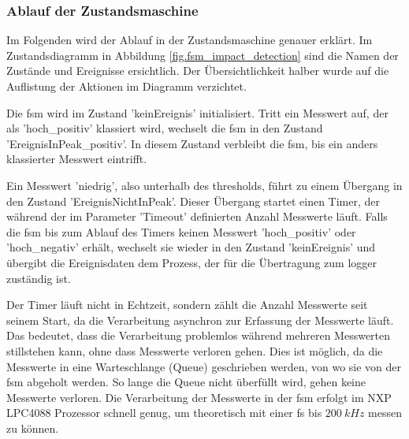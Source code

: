 \subsubsection{Ablauf der Zustandsmaschine}
Im Folgenden wird der Ablauf in der Zustandsmaschine genauer erklärt. Im Zustandsdiagramm in Abbildung \ref{fig.fsm_impact_detection} sind die Namen der Zustände und Ereignisse ersichtlich. Der Übersichtlichkeit halber wurde auf die Auflistung der Aktionen im Diagramm verzichtet.

Die \gls{fsm} wird im Zustand 'keinEreignis' initialisiert. Tritt ein Messwert auf, der als 'hoch\_positiv' klassiert wird, wechselt die \gls{fsm} in den Zustand 'EreignisInPeak\_positiv'. In diesem Zustand verbleibt die \gls{fsm}, bis ein anders klassierter Messwert eintrifft. 

Ein Messwert 'niedrig', also unterhalb des \gls{threshold}s, führt zu einem Übergang in den Zustand 'EreignisNichtInPeak'. Dieser Übergang startet einen Timer, der während der im Parameter 'Timeout' definierten Anzahl Messwerte läuft. Falls die \gls{fsm} bis zum Ablauf des Timers keinen Messwert 'hoch\_positiv' oder 'hoch\_negativ' erhält, wechselt sie wieder in den Zustand 'keinEreignis' und übergibt die Ereignisdaten dem Prozess, der für die Übertragung zum \gls{logger} zuständig ist. 

Der Timer läuft nicht in Echtzeit, sondern zählt die Anzahl Messwerte seit seinem Start, da die Verarbeitung asynchron zur Erfassung der Messwerte läuft. Das bedeutet, dass die Verarbeitung problemlos während mehreren Messwerten stillstehen kann, ohne dass Messwerte verloren gehen. Dies ist möglich, da die Messwerte in eine Warteschlange (Queue) geschrieben werden, von wo sie von der \gls{fsm} abgeholt werden. So lange die Queue nicht überfüllt wird, gehen keine Messwerte verloren. Die Verarbeitung der Messwerte in der \gls{fsm} erfolgt im NXP LPC4088 Prozessor schnell genug, um theoretisch mit einer \gls{fs} bis \ensuremath{200~kHz} messen zu können.



